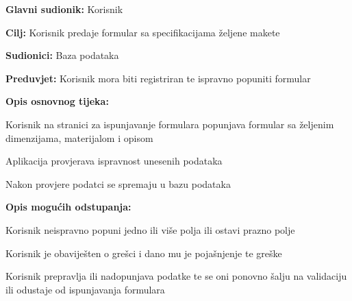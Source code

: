 				\noindent {}
				\begin{packed_item}
					
					\item \textbf{Glavni sudionik: }Korisnik
					\item  \textbf{Cilj:} Korisnik predaje formular sa specifikacijama željene makete 
					\item  \textbf{Sudionici:} Baza podataka
					\item  \textbf{Preduvjet:} Korisnik mora biti registriran te ispravno popuniti formular
					\item  \textbf{Opis osnovnog tijeka:}
					
					\item[] \begin{packed_enum}
						
						\item Korisnik na stranici za ispunjavanje formulara popunjava formular sa željenim dimenzijama, materijalom i opisom
						\item Aplikacija provjerava ispravnost unesenih podataka
						\item Nakon provjere podatci se spremaju u bazu podataka
					\end{packed_enum}
					
					\item  \textbf{Opis mogućih odstupanja:}
					
					\item[] \begin{packed_item}
 
						\item[2.a] Korisnik neispravno popuni jedno ili više polja ili ostavi prazno polje
						\item[] \begin{packed_enum}
							
							\item Korisnik je obaviješten o grešci i dano mu je pojašnjenje te greške
							\item Korisnik prepravlja ili nadopunjava podatke te se oni ponovno šalju na validaciju ili odustaje od ispunjavanja formulara
							
						\end{packed_enum}	
					\end{packed_item}
				\end{packed_item}


